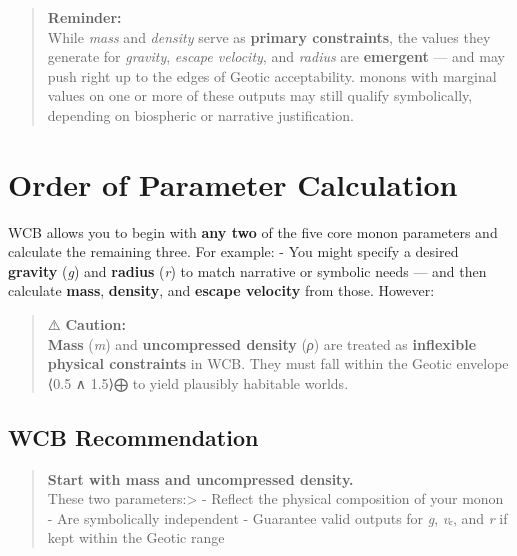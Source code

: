 \documentclass[
  letterpaper,
]{book}
\begin{document}
\begin{quote}
\textbf{Reminder:}\\
While \emph{mass} and \emph{density} serve as \textbf{primary
constraints}, the values they generate for \emph{gravity}, \emph{escape
velocity}, and \emph{radius} are \textbf{emergent} --- and may push
right up to the edges of Geotic acceptability. monons with marginal
values on one or more of these outputs may still qualify symbolically,
depending on biospheric or narrative justification.
\end{quote}

\section{Order of Parameter
Calculation}\label{order-of-parameter-calculation}

WCB allows you to begin with \textbf{any two} of the five core monon
parameters and calculate the remaining three. For example: - You might
specify a desired \textbf{gravity} (\emph{g}) and \textbf{radius}
(\emph{r}) to match narrative or symbolic needs --- and then calculate
\textbf{mass}, \textbf{density}, and \textbf{escape velocity} from
those. However:

\begin{quote}
⚠️ \textbf{Caution:}\\
\textbf{Mass} (\emph{m}) and \textbf{uncompressed density} (\emph{ρ})
are treated as \textbf{inflexible physical constraints} in WCB. They
must fall within the Geotic envelope ⟨0.5 ∧ 1.5⟩⨁ to yield plausibly
habitable worlds.
\end{quote}

\subsection{WCB Recommendation}\label{wcb-recommendation}

\begin{quote}
\textbf{Start with mass and uncompressed density.}\\
These two parameters:\textgreater{} - Reflect the physical composition
of your monon - Are symbolically independent - Guarantee valid outputs
for \emph{g}, \emph{vₑ}, and \emph{r} if kept within the Geotic range
\end{quote}
\end{document}
